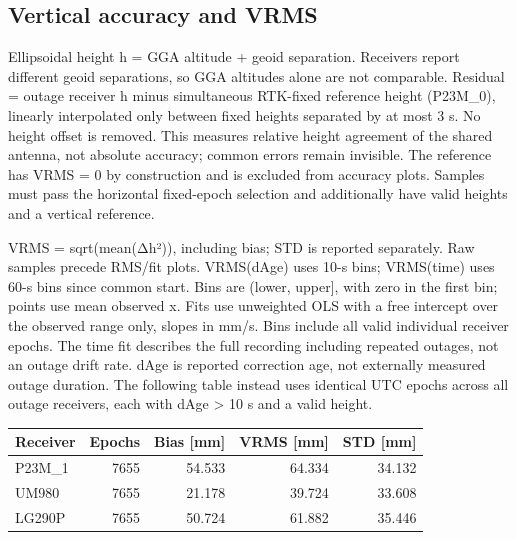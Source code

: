\documentclass[11pt,a4paper]{article}
\numberwithin{equation}{section}
\numberwithin{figure}{section}
\begin{document}
\subsection{Vertical accuracy and VRMS}

Ellipsoidal height h = GGA altitude + geoid separation. Receivers report different geoid separations, so GGA altitudes alone are not comparable. Residual = outage receiver h minus simultaneous RTK-fixed reference height (P23M\_0), linearly interpolated only between fixed heights separated by at most 3 s. No height offset is removed. This measures relative height agreement of the shared antenna, not absolute accuracy; common errors remain invisible. The reference has VRMS = 0 by construction and is excluded from accuracy plots. Samples must pass the horizontal fixed-epoch selection and additionally have valid heights and a vertical reference.

VRMS = sqrt(mean(Δh²)), including bias; STD is reported separately. Raw samples precede RMS/\allowbreak{}fit plots. VRMS(dAge) uses 10-s bins; VRMS(time) uses 60-s bins since common start. Bins are (lower, upper], with zero in the first bin; points use mean observed x. Fits use unweighted OLS with a free intercept over the observed range only, slopes in mm/\allowbreak{}s. Bins include all valid individual receiver epochs. The time fit describes the full recording including repeated outages, not an outage drift rate. dAge is reported correction age, not externally measured outage duration. The following table instead uses identical UTC epochs across all outage receivers, each with dAge > 10 s and a valid height.

\begin{center}\begin{lrbox}{\reporttable}\small\setlength{\tabcolsep}{4pt}\begin{tabular}{lrrrr}\toprule
Receiver & Epochs & Bias [mm] & VRMS [mm] & STD [mm]\\\midrule
P23M\_1 & 7655 & 54.533 & 64.334 & 34.132\\
UM980 & 7655 & 21.178 & 39.724 & 33.608\\
LG290P & 7655 & 50.724 & 61.882 & 35.446\\
\bottomrule\end{tabular}\end{lrbox}\ifdim\wd\reporttable>\linewidth\resizebox{\linewidth}{!}{\usebox{\reporttable}}\else\usebox{\reporttable}\fi\end{center}
\end{document}
